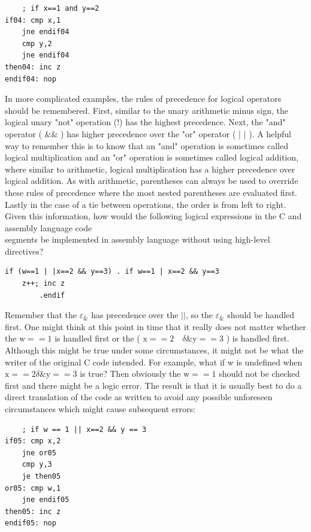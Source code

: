 \documentclass[10pt]{article}
\begin{document}
\begin{verbatim}
    ; if x==1 and y==2
if04: cmp x,1
    jne endif04
    cmp y,2
    jne endif04
then04: inc z
endif04: nop
\end{verbatim}

In more complicated examples, the rules of precedence for logical operators should be remembered. First, similar to the unary arithmetic minus sign, the logical unary "not" operation (!) has the highest precedence. Next, the "and" operator ( $\& \&$ ) has higher precedence over the "or" operator ( | | ). A helpful way to remember this is to know that an "and" operation is sometimes called logical multiplication and an "or" operation is sometimes called logical addition, where similar to arithmetic, logical multiplication has a higher precedence over logical addition. As with arithmetic, parentheses can always be used to override these rules of precedence where the most nested parentheses are evaluated first. Lastly in the case of a tie between operations, the order is from left to right. Given this information, how would the following logical expressions in the C and assembly language code\\
segments be implemented in assembly language without using high-level directives?

\begin{verbatim}
if (w==1 | |x==2 && y==3) . if w==1 | x==2 && y==3
    z++; inc z
        .endif
\end{verbatim}

Remember that the $\varepsilon_{\&}$ has precedence over the $\left|\mid\right.$, so the $\varepsilon_{\&}$ should be handled first. One might think at this point in time that it really does not matter whether the $\mathrm{w}==1$ is handled first or the ( $\mathrm{x}==2 \quad \delta \& \mathrm{y}==3$ ) is handled first. Although this might be true under some circumstances, it might not be what the writer of the original C code intended. For example, what if w is undefined when $\mathrm{x}==2 \delta \& \mathrm{y}==3$ is true? Then obviously the $\mathrm{w}==1$ should not be checked first and there might be a logic error. The result is that it is usually best to do a direct translation of the code as written to avoid any possible unforeseen circumstances which might cause subsequent errors:

\begin{verbatim}
    ; if w == 1 || x==2 && y == 3
if05: cmp x,2
    jne or05
    cmp y,3
    je then05
or05: cmp w,1
    jne endif05
then05: inc z
endif05: nop
\end{verbatim}
\end{document}
